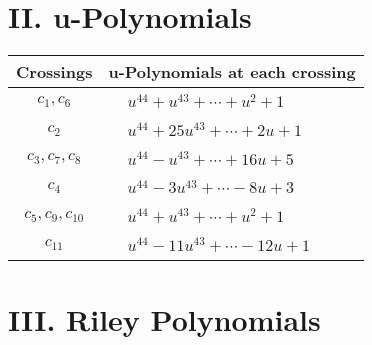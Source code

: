 \documentclass[1p]{elsarticle_modified}
\theoremstyle{definition}
\begin{document}
\newpage\renewcommand{\arraystretch}{1}
\centering \section*{ II. u-Polynomials}
\begin{tabular}{m{50pt}|m{274pt}}
Crossings & \hspace{64pt}u-Polynomials at each crossing \\
\hline $$\begin{aligned}c_{1},c_{6}\end{aligned}$$&$\begin{aligned}
&u^{44}+u^{43}+\cdots+u^2+1
\end{aligned}$\\
\hline $$\begin{aligned}c_{2}\end{aligned}$$&$\begin{aligned}
&u^{44}+25 u^{43}+\cdots+2 u+1
\end{aligned}$\\
\hline $$\begin{aligned}c_{3},c_{7},c_{8}\end{aligned}$$&$\begin{aligned}
&u^{44}- u^{43}+\cdots+16 u+5
\end{aligned}$\\
\hline $$\begin{aligned}c_{4}\end{aligned}$$&$\begin{aligned}
&u^{44}-3 u^{43}+\cdots-8 u+3
\end{aligned}$\\
\hline $$\begin{aligned}c_{5},c_{9},c_{10}\end{aligned}$$&$\begin{aligned}
&u^{44}+u^{43}+\cdots+u^2+1
\end{aligned}$\\
\hline $$\begin{aligned}c_{11}\end{aligned}$$&$\begin{aligned}
&u^{44}-11 u^{43}+\cdots-12 u+1
\end{aligned}$\\
\hline
\end{tabular}\newpage\renewcommand{\arraystretch}{1}
\centering \section*{ III. Riley Polynomials}
\end{document}
